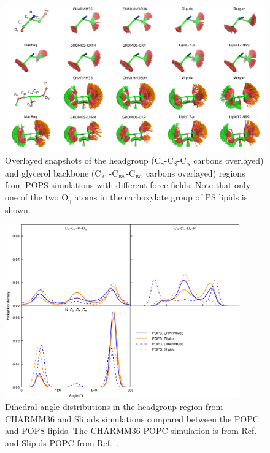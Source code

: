 \documentclass[journal=jpcbfk,manuscript=article]{achemso}
\begin{document}
\begin{figure}[]
  \centering
  \includegraphics[width=1.03\textwidth]{../Figs/figS8.png}
  \caption{\label{HGandGLYstructuresPS}
    Overlayed snapshots of the headgroup (C$_\gamma$-C$_\beta$-C$_\alpha$ carbons overlayed) and
    glycerol backbone (C$_{\rm g_1}$-C$_{\rm g_2}$-C$_{\rm g_3}$ carbons overlayed) regions from POPS simulations with different force fields.
    Note that only one of the two O$_\gamma$ atoms in the carboxylate group of PS lipids is shown.
  }
\end{figure}

\begin{figure}[]
  \centering
  \includegraphics[width=0.9\textwidth]{../Figs/figS11.png}
  \caption{\label{dihedralsHGpc}
    Dihedral angle distributions in the headgroup region from CHARMM36 and Slipids simulations
    compared between the POPC and POPS lipids. 
    The CHARMM36 POPC simulation is from Ref.~ and Slipids POPC from Ref.~.
  }
\end{figure}
\end{document}
